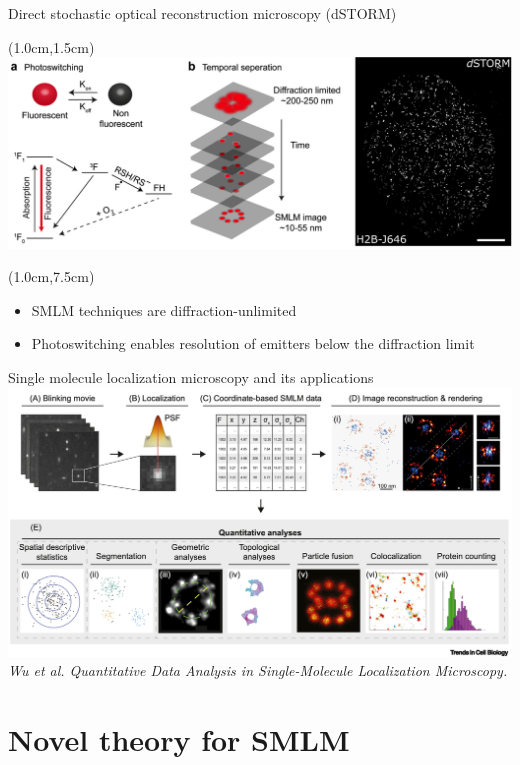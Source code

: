 \documentclass{beamer}					%
\begin{document}
\begin{frame}{Direct stochastic optical reconstruction microscopy (dSTORM)}
\begin{textblock*}{13cm}(1.0cm,1.5cm)
\includegraphics[width=\textwidth]{Intro.png}
\end{textblock*}
\begin{textblock*}{\textwidth}(1.0cm,7.5cm)
\begin{itemize}
\item SMLM techniques are diffraction-unlimited
\item Photoswitching enables resolution of emitters below the diffraction limit
\end{itemize}
\end{textblock*}
\end{frame}

\begin{frame}{Single molecule localization microscopy and its applications}
\includegraphics[width=\textwidth]{Apps}
\textit{Wu et al. Quantitative Data Analysis in Single-Molecule Localization Microscopy.}
\end{frame}

\section{Novel theory for SMLM} 
\end{document}
